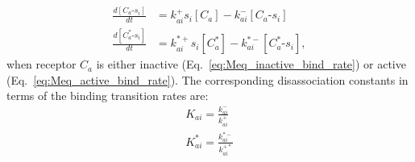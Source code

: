 \documentclass[9pt,twoside,lineno]{pnas-new}
\begin{document}
\begin{align}
\frac{d[C_a\text{-}s_i]}{dt} &= k^+_{ai}s_i[C_a] - k^-_{ai}[C_a\text{-}s_i] \label{eq:Meq_inactive_bind_rate}\\
\frac{d[C^*_a\text{-}s_i]}{dt} &= k^{*+}_{ai}s_i[C^*_a] - k^{*-}_{ai}[C^*_a\text{-}s_i],
\label{eq:Meq_active_bind_rate}
\end{align}
when receptor $C_a$ is either inactive (Eq.~\ref{eq:Meq_inactive_bind_rate}) or active (Eq.~\ref{eq:Meq_active_bind_rate}). The corresponding disassociation constants in terms of the binding transition rates are:
\begin{align}
K_{ai} = \frac{k^-_{ai}}{k^+_{ai}} \nonumber \\
K^*_{ai} = \frac{k^{*-}_{ai}}{k^{+*}_{ai}} 
\label{eq:Kd}
\end{align}
\end{document}
